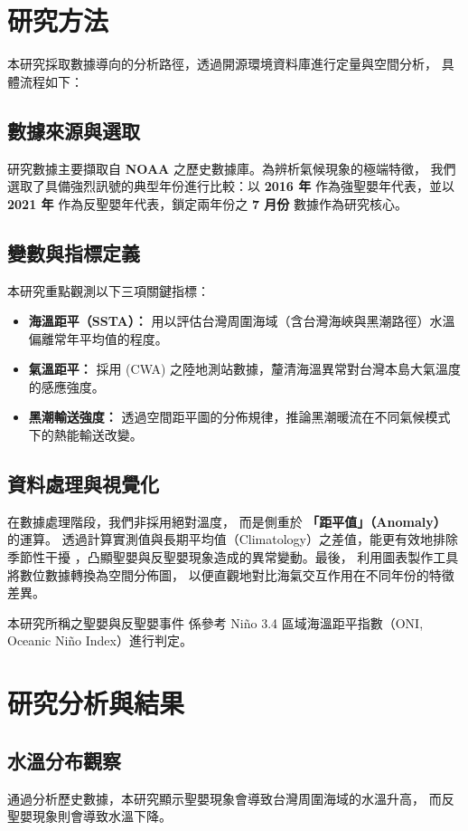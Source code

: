\documentclass[UTF8, fontset=none,12pt]{ctexart}
\begin{document}
    \section{研究方法}
本研究採取數據導向的分析路徑，透過開源環境資料庫進行定量與空間分析，
具體流程如下：

\subsection{數據來源與選取}
研究數據主要擷取自 \textbf{NOAA} 
之歷史數據庫。為辨析氣候現象的極端特徵，
我們選取了具備強烈訊號的典型年份進行比較：以 \textbf{2016 年} 
作為強聖嬰年代表，並以 \textbf{2021 年} 作為反聖嬰年代表，鎖定兩年份之
 \textbf{7 月份} 數據作為研究核心。

\subsection{變數與指標定義}
本研究重點觀測以下三項關鍵指標：
\begin{itemize}
    \item \textbf{海溫距平（SSTA）：} 用以評估台灣周圍海域（含台灣海峽與黑潮路徑）水溫偏離常年平均值的程度。
    \item \textbf{氣溫距平：} 採用 (CWA) 之陸地測站數據，釐清海溫異常對台灣本島大氣溫度的感應強度。
    \item \textbf{黑潮輸送強度：} 透過空間距平圖的分佈規律，推論黑潮暖流在不同氣候模式下的熱能輸送改變。
\end{itemize}

\subsection{資料處理與視覺化}
在數據處理階段，我們非採用絕對溫度，
而是側重於 \textbf{「距平值」（Anomaly）} 的運算。
透過計算實測值與長期平均值（Climatology）之差值，能更有效地排除季節性干擾
，凸顯聖嬰與反聖嬰現象造成的異常變動。最後，
利用圖表製作工具將數位數據轉換為空間分佈圖，
以便直觀地對比海氣交互作用在不同年份的特徵差異。

本研究所稱之聖嬰與反聖嬰事件
係參考 Niño 3.4 區域海溫距平指數（ONI, Oceanic Niño Index）進行判定。

\section{研究分析與結果}
\subsection{水溫分布觀察}
通過分析歷史數據，本研究顯示聖嬰現象會導致台灣周圍海域的水溫升高，
而反聖嬰現象則會導致水溫下降。
\end{document}

